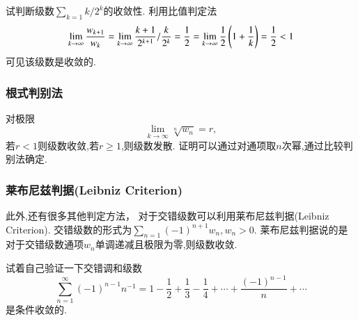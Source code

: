 \begin{examplebox}{试判断级数$\sum_{k=1} k/2^k$的收敛性.}
    利用比值判定法
    \[ 
        \lim_{k\to \infty} \frac{w_{k+1}}{w_k}=\lim_{k\to \infty} \frac{k+1}{2^{k+1}} / \frac{k}{2^{k}}=\frac{1}{2} 
        = \lim_{k\to \infty} \frac{1}{2}\left(1+\frac{1}{k}\right) 
        = {\frac{1}{2}} < 1
    \]
    可见该级数是收敛的.
\end{examplebox}

\subsubsection{根式判别法}
对极限
$$
\lim_{k\to \infty} \sqrt[n]{w_n} = r,
$$
若$r<1$则级数收敛,若$r\geq 1$,则级数发散. 证明可以通过对通项取$n$次幂,通过比较判别法确定.



\subsubsection{莱布尼兹判据(Leibniz Criterion)}
此外,还有很多其他判定方法， 对于交错级数可以利用莱布尼兹判据(Leibniz Criterion).
交错级数的形式为$\sum_{n=1} (-1)^{n+1} w_n, w_n >0$. 莱布尼兹判据说的是对于交错级数通项$w_n$单调递减且极限为零,则级数收敛.

试着自己验证一下交错调和级数
\begin{equation}
    \sum_{n=1}^{\infty}(-1)^{n-1} n^{-1}=1-\frac{1}{2}+\frac{1}{3}-\frac{1}{4}+\cdots+\frac{(-1)^{n-1}}{n}+\cdots
\end{equation}
是条件收敛的.
